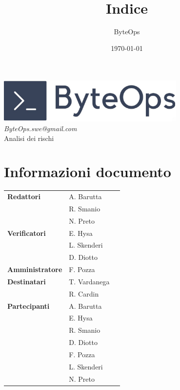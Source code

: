 \documentclass{article}
\title{\textbf{\fontsize{30}{6}\selectfont Indice}}
\author{\fontsize{14}{6}\selectfont ByteOps}
\date{\today}
\begin{document}
\pagestyle{fancy}
\begin{center}
\includegraphics[width = 0.7\textwidth]{../../Images/logo.png} \\
\vspace{0.2cm}
\textcolor[RGB]{60, 60, 60}{\textit{ByteOps.swe@gmail.com}} \\
\vspace{1cm}
\fontsize{16}{6}\selectfont Analisi dei rischi \\
\vspace{0.5cm}
\end{center}

\section*{Informazioni documento}
\def\arraystretch{1.2}
\begin{tabular}{>{\raggedleft\arraybackslash}p{}|>{\raggedright\arraybackslash}p{}c}
\hline
\addlinespace
    \textbf{Redattori} & A. Barutta \\ & R. Smanio \\ & N. Preto \vspace{10pt} \\
    \textbf{Verificatori} & E. Hysa \\ & L. Skenderi \\ & D. Diotto \vspace{10pt} \\
    \textbf{Amministratore} & F. Pozza \vspace{10pt} \\
    \textbf{Destinatari} & T. Vardanega \\ & R. Cardin \vspace{10pt} \\
    \textbf{Partecipanti} & A. Barutta \\ & E. Hysa \\ & R. Smanio \\ & D. Diotto \\ & F. Pozza \\ & L. Skenderi \\ & N. Preto \vspace{10pt} \\
\end{tabular}
\pagebreak 
\end{document}
